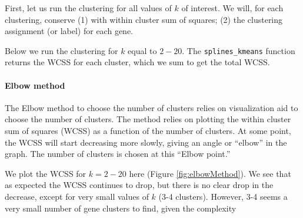 \documentclass[9pt,a4paper,]{extarticle}
\newenvironment{Shaded}{\begin{snugshade}}{\end{snugshade}}
\newcommand{\ControlFlowTok}[1]{\textcolor[rgb]{0.13,0.29,0.53}{\textbf{#1}}}
\newcommand{\DataTypeTok}[1]{\textcolor[rgb]{0.13,0.29,0.53}{#1}}
\newcommand{\DecValTok}[1]{\textcolor[rgb]{0.00,0.00,0.81}{#1}}
\newcommand{\KeywordTok}[1]{\textcolor[rgb]{0.13,0.29,0.53}{\textbf{#1}}}
\newcommand{\NormalTok}[1]{#1}
\newcommand{\OperatorTok}[1]{\textcolor[rgb]{0.81,0.36,0.00}{\textbf{#1}}}
\newcommand{\StringTok}[1]{\textcolor[rgb]{0.31,0.60,0.02}{#1}}
\begin{document}
First, let us run the clustering for all values of \(k\) of interest. We
will, for each clustering, conserve (1) with within cluster sum of
squares; (2) the clustering assignment (or label) for each gene.

Below we run the clustering for \(k\) equal to \(2-20\). The \texttt{splines\_kmeans}
function returns the WCSS for each cluster, which we sum to get the total
WCSS.

\begin{Shaded}
\end{Shaded}

\hypertarget{elbow-method}{%
\paragraph{Elbow method}\label{elbow-method}}

The Elbow method to choose the number of clusters relies on visualization aid
to choose the number of clusters. The method relies on plotting the within
cluster sum of squares (WCSS) as a function of the number of clusters. At some
point, the WCSS will start decreasing more slowly, giving an angle or ``elbow''
in the graph. The number of clusters is chosen at this ``Elbow point.''

We plot the WCSS for \(k=2-20\) here (Figure \ref{fig:elbowMethod}).
We see that as expected the WCSS continues
to drop, but there is no clear drop in the decrease, except for very small
values of \(k\) (3-4 clusters). However, 3-4 seems a very small number of gene
clusters to find, given the complexity
\end{document}

